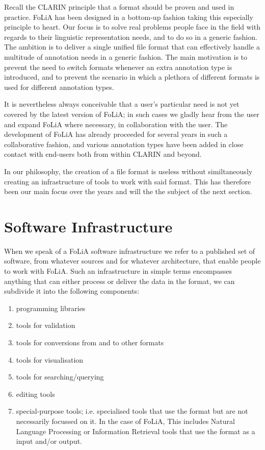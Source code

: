 \documentclass[a4paper,11pt]{article}
\begin{document}
Recall the CLARIN principle that a format should be proven and used in
practice. FoLiA has been designed in a bottom-up fashion taking this especially
principle to heart. Our focus is to solve real problems people face in the
field with regards to their linguistic representation needs, and to do so in a
generic fashion. The ambition is to deliver a single unified file format that
can effectively handle a multitude of annotation needs in a generic fashion.
The main motivation is to prevent the need to switch formats whenever an extra
annotation type is introduced, and to prevent the scenario in which a plethora
of different formats is used for different annotation types.

It is nevertheless always conceivable that a user's particular need is not yet
covered by the latest version of FoLiA; in such cases we gladly hear from the
user and expand FoLiA where necessary, in collaboration with the user. The
development of FoLiA has already proceeded for several years in such a
collaborative fashion, and various annotation types have been added in close
contact with end-users both from within CLARIN and beyond.

In our philosophy, the creation of a file format is useless without
similtaneously creating an infrastructure of tools to work with said format.
This has therefore been our main focus over the years and will the the subject
of the next section.

\section{Software Infrastructure}
\label{sec:softwareinfrastructure}

When we speak of a FoLiA software infrastructure we refer to a published set of
software, from whatever sources and for whatever architecture, that enable
people to work with FoLiA. Such an infrastructure in simple terms encompasses
anything that can either process or deliver the data in the format, we can
subdivide it into the following components:

\begin{enumerate}
\item programming libraries
\item tools for validation
\item tools for conversions from and to other formats
\item tools for visualisation
\item tools for searching/querying
\item editing tools
\item special-purpose tools; i.e. specialised tools that use the format but are
    not necessarily focussed on it. In the case of FoLiA, This includes Natural
    Language Processing or Information Retrieval tools that use the format as a
    input and/or output.
\end{enumerate}
\end{document}
